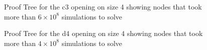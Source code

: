 \begin{figure}
\centering

\caption[Proof Tree for the c3 Opening on Size 4]{Proof Tree for the c3 opening on size 4 showing nodes that took more than $6 \times 10^8$ simulations to solve}
\label{fig:proof-c3}
\end{figure}

\begin{figure}
\centering

\caption[Proof Tree for the d4 Opening on Size 4]{Proof Tree for the d4 opening on size 4 showing nodes that took more than $4 \times 10^8$ simulations to solve}
\label{fig:proof-d4}
\end{figure}

